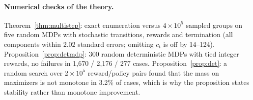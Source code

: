 \documentclass[11pt]{article}
\theoremstyle{remark}
\begin{document}
\begin{table}[h]
\centering
\caption{Bandit diagnostics (5 arms, groups of 8, 20 seeds): number of seeds whose final policy picks the arm with the highest mean. In the skewed task one arm wins 90\% of comparisons but has a lower mean.}
\label{tab:bandit}
\small
{}
\end{table}

\begin{table}[h]
\centering
\caption{Same-granularity comparison with and without per-step credit (5 seeds, seeds 0--4). Trajectory-level variants credit every step with the whole-trajectory signal.}
\label{tab:phaseb}
\small
\setlength{\tabcolsep}{3pt}
\end{table}

\begin{table}[h]
\centering
\caption{Hyperparameter grid: mean AUC over 10 seeds per setting (columns: learning rate, then update epochs).}
\label{tab:sweep}
\small
\setlength{\tabcolsep}{3pt}
\end{table}

\begin{table}[h]
\centering
\caption{Acrobot under label noise (final return, 10 seeds; in parentheses the number of seeds ending below $-400$).}
\label{tab:noise-acrobot}
\small
\setlength{\tabcolsep}{3pt}
\end{table}

\paragraph{Numerical checks of the theory.} Theorem~\ref{thm:multistep}: exact enumeration versus $4\times10^5$ sampled groups on five random MDPs with stochastic transitions, rewards and termination (all components within 2.02 standard errors; omitting $c_t$ is off by 14--124). Proposition~\ref{prop:detmdp}: 300 random deterministic MDPs with tied integer rewards, no failures in 1{,}670 / 2{,}176 / 277 cases. Proposition~\ref{prop:det}: a random search over $2\times10^5$ reward/policy pairs found that the mass on maximizers is not monotone in 3.2\% of cases, which is why the proposition states stability rather than monotone improvement.
\end{document}

